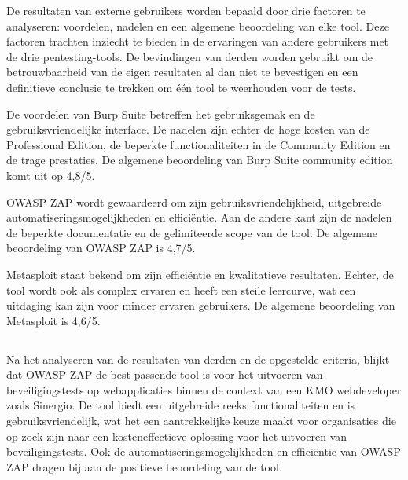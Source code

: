 De resultaten van externe gebruikers worden bepaald door drie factoren te analyseren: voordelen, nadelen en een algemene 
beoordeling van elke tool. Deze factoren trachten inziecht te bieden in de ervaringen van andere gebruikers met de drie pentesting-tools. 
De bevindingen van derden worden gebruikt om de betrouwbaarheid van de eigen resultaten al dan niet te bevestigen en een definitieve conclusie 
te trekken om één tool te weerhouden voor de tests.

De voordelen van Burp Suite betreffen het gebruiksgemak en de gebruiksvriendelijke interface. De nadelen zijn echter 
de hoge kosten van de Professional Edition, de beperkte functionaliteiten in de Community Edition en de trage prestaties. De 
algemene beoordeling van Burp Suite community edition komt uit op 4,8/5.

OWASP ZAP wordt gewaardeerd om zijn gebruiksvriendelijkheid, uitgebreide automatiseringsmogelijkheden en efficiëntie. Aan de 
andere kant zijn de nadelen de beperkte documentatie en de gelimiteerde scope van de tool. De algemene beoordeling van OWASP 
ZAP is 4,7/5.

Metasploit staat bekend om zijn efficiëntie en kwalitatieve resultaten. Echter, de tool wordt ook als complex ervaren en 
heeft een steile leercurve, wat een uitdaging kan zijn voor minder ervaren gebruikers. De algemene beoordeling van Metasploit 
is 4,6/5.

\subsection{}
Na het analyseren van de resultaten van derden en de opgestelde criteria, blijkt dat OWASP ZAP de best passende tool is voor het uitvoeren van 
beveiligingstests op webapplicaties binnen de context van een KMO webdeveloper zoals Sinergio. De tool biedt een uitgebreide reeks functionaliteiten en is gebruiksvriendelijk, wat 
het een aantrekkelijke keuze maakt voor organisaties die op zoek zijn naar een kosteneffectieve oplossing voor het uitvoeren 
van beveiligingstests. Ook de automatiseringsmogelijkheden en efficiëntie van OWASP ZAP dragen bij aan de positieve 
beoordeling van de tool.

\section{}
\subsection{}
